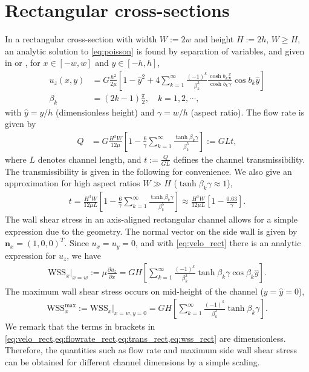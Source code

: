 \documentclass{article}
\begin{document}
\section{Rectangular cross-sections}
In a rectangular cross-section with width $W:=2w$ and height $H:=2h$, $W \geq H$, an analytic solution to \cref{eq:poisson} is found by separation of variables, and given in \cite{Shah1978} or \cite{Papanastasiou2021}, for $x \in [-w, w]$ and $y \in [-h, h]$,
\begin{align}
    u_z(x,y) &= G\frac{h^2}{2\mu} \left[ 1 - \hat{y}^2 + 4 \sum\limits_{k=1}^{\infty} \frac{(-1)^k}{\beta_k^3} \frac{\cosh{b_k \frac{x}{h}}}{\cosh{b_k \gamma}} \cos{b_k \hat{y}} \right] \label{eq:velo_rect}\\\nonumber
    \beta_k &= (2k-1)\frac{\pi}{2}, \quad k = 1,2,\cdots,
\end{align}
with $\hat{y} = y/h$ (dimensionless height) and $\gamma = w/h$ (aspect ratio). The flow rate is given by \cite{Papanastasiou2021}
\begin{align}
    Q &= G\frac{H^3 W}{12\mu} \left[ 1 - \frac{6}{\gamma} \sum\limits_{k=1}^{\infty} \frac{\tanh{\beta_k \gamma}}{\beta_k^5} \right] := G L t, \label{eq:flowrate_rect}
\end{align}
where $L$ denotes channel length, and $t := \frac{Q}{GL}$ defines the channel transmissibility.
The transmissibility is given in the following for convenience. We also give an approximation for high aspect ratios $W \gg H$ ($\tanh{\beta_k \gamma} \approx 1$),
\begin{align}
    t = \frac{H^3W}{12\mu L} \left[ 1 - \frac{6}{\gamma} \sum\limits_{k=1}^{\infty} \frac{\tanh{\beta_k \gamma}}{\beta_k^5} \right] \approx \frac{H^3W}{12\mu L}\left[1 - \frac{0.63}{\gamma}\right]. \label{eq:trans_rect}
\end{align}
The wall shear stress in an axis-aligned rectangular channel allows for a simple expression due to the geometry. The normal vector on the side wall is given by $\boldsymbol{n}_x = (1,0,0)^T$. Since $u_x = u_y = 0$, and with \cref{eq:velo_rect} there is an analytic expression for $u_z$, we have
\begin{align}
    \text{WSS}_x \big\rvert_{x=w} := \mu\frac{\partial u_z}{\partial x} = GH \left[ \sum\limits_{k=1}^{\infty} \frac{(-1)^k}{\beta_k^2} \tanh{\beta_k \gamma} \cos{\beta_k \hat{y}} \right]. \label{eq:wss_rect}
\end{align}
The maximum wall shear stress occurs on mid-height of the channel ($y=\hat{y} = 0$),
\begin{align}
    \text{WSS}^\text{max}_x := \text{WSS}_x \big\rvert_{x=w,y=0} = GH \left[ \sum\limits_{k=1}^{\infty} \frac{(-1)^k}{\beta_k^2} \tanh{\beta_k \gamma} \right]. \label{eq:wss_rect}
\end{align}
We remark that the terms in brackets in \cref{eq:velo_rect,eq:flowrate_rect,eq:trans_rect,eq:wss_rect} are dimensionless. Therefore, the quantities such as flow rate and maximum side wall shear stress can be obtained for different channel dimensions by a simple scaling.
\end{document}
